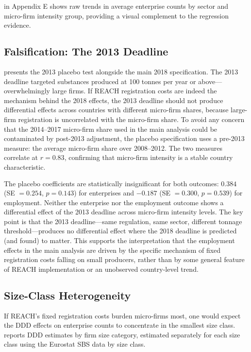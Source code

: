 \documentclass[12pt]{article}
\begin{document}
 in Appendix E shows raw trends in average enterprise counts by sector and micro-firm intensity group, providing a visual complement to the regression evidence.

\subsection{Falsification: The 2013 Deadline}

 presents the 2013 placebo test alongside the main 2018 specification. The 2013 deadline targeted substances produced at 100 tonnes per year or above---overwhelmingly large firms. If REACH registration costs are indeed the mechanism behind the 2018 effects, the 2013 deadline should not produce differential effects across countries with different micro-firm shares, because large-firm registration is uncorrelated with the micro-firm share. To avoid any concern that the 2014--2017 micro-firm share used in the main analysis could be contaminated by post-2013 adjustment, the placebo specification uses a pre-2013 measure: the average micro-firm share over 2008--2012. The two measures correlate at $r = 0.83$, confirming that micro-firm intensity is a stable country characteristic.



The placebo coefficients are statistically insignificant for both outcomes: $0.384$ (SE $= 0.254$, $p = 0.143$) for enterprises and $-0.187$ (SE $= 0.300$, $p = 0.539$) for employment. Neither the enterprise nor the employment outcome shows a differential effect of the 2013 deadline across micro-firm intensity levels. The key point is that the 2013 deadline---same regulation, same sector, different tonnage threshold---produces no differential effect where the 2018 deadline is predicted (and found) to matter. This supports the interpretation that the employment effects in the main analysis are driven by the specific mechanism of fixed registration costs falling on small producers, rather than by some general feature of REACH implementation or an unobserved country-level trend.

\subsection{Size-Class Heterogeneity}
\label{sec:heterogeneity}

If REACH's fixed registration costs burden micro-firms most, one would expect the DDD effects on enterprise counts to concentrate in the smallest size class.  reports DDD estimates by firm size category, estimated separately for each size class using the Eurostat SBS data by size class.
\end{document}
